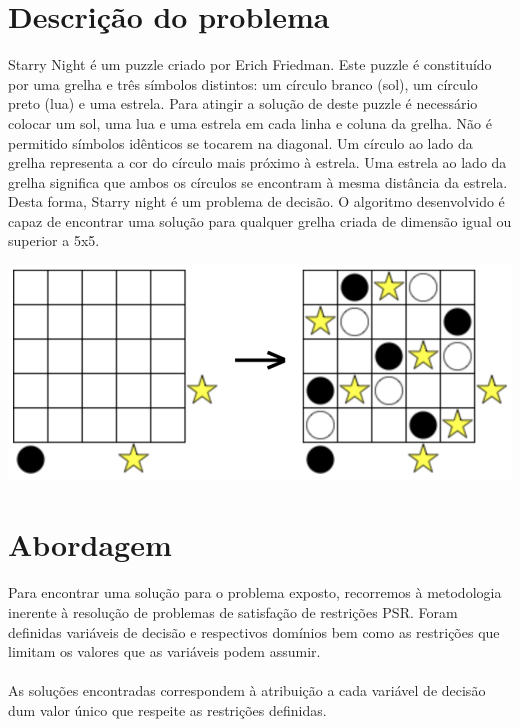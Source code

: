 \documentclass[a4paper]{article}
\begin{document}
\section{Descrição do problema}

Starry Night é um puzzle criado por Erich Friedman. Este puzzle é constituído por uma grelha e três símbolos distintos: um círculo branco (sol), um círculo preto (lua) e uma estrela. Para atingir a solução de deste puzzle é necessário colocar um sol, uma lua e uma estrela em cada linha e coluna da grelha. Não é permitido símbolos idênticos se tocarem na diagonal. Um círculo ao lado da grelha representa a cor do círculo mais próximo à estrela. Uma estrela ao lado da grelha significa que ambos os círculos se encontram à mesma distância da estrela. Desta forma, Starry night é um problema de decisão. O algoritmo desenvolvido é capaz de encontrar uma solução para qualquer grelha criada de dimensão igual ou superior a 5x5.

\begin{center}
    \includegraphics[scale=0.4]{img/1.png}
\end{center}

\section{Abordagem}
\paragraph{}
Para encontrar uma solução para o problema exposto, recorremos à metodologia inerente à resolução de problemas de satisfação de restrições PSR.
Foram definidas variáveis de decisão e respectivos domínios bem como as restrições que limitam os valores que as variáveis podem assumir.

\paragraph{}
As soluções encontradas correspondem à atribuição a cada variável de decisão dum valor único que respeite as restrições definidas.
\end{document}

